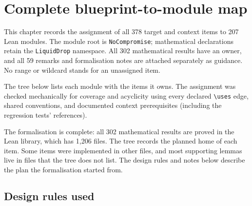 \chapter{Complete blueprint-to-module map}\label{ch:lean-files}

This chapter records the assignment of all 378 target and context items to
207 Lean modules.  The module root is \texttt{NoCompromise}; mathematical
declarations retain the \texttt{LiquidDrop} namespace.  All 302 mathematical
results have an owner, and all 59 remarks and formalisation notes are attached
separately as guidance.  No range or wildcard stands for an unassigned item.

The tree below lists each module with the items it owns.  The assignment
was checked mechanically for coverage and acyclicity using every declared
\verb|\uses| edge, shared conventions, and documented context prerequisites
(including the regression tests' references).

The formalisation is complete: all 302 mathematical results are proved in the
Lean library, which has 1,206 files.  The tree records the planned home of
each item.  Some items were implemented in other files, and most supporting
lemmas live in files that the tree does not list.  The design rules and notes
below describe the plan the formalisation started from.

\section{Design rules used}

